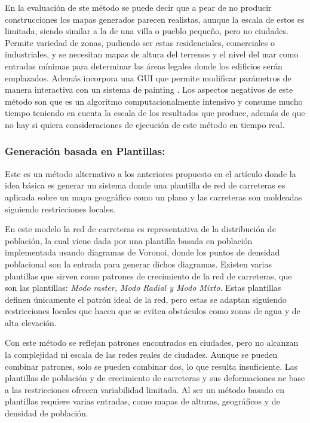             En la evaluación de ste método se puede decir que a pear de no producir construcciones los mapas generados parecen realistas, aunque la escala de estos es limitada, siendo similar a la de una villa o pueblo pequeño, pero no ciudades. Permite variedad de zonas, pudiendo ser estas residenciales, comerciales o industriales, y se necesitan mapas de altura del terrenos y el nivel del mar como entradas mínimas para determinar las áreas legales donde los edificios serán emplazados. Además incorpora una GUI que permite modificar parámetros de manera interactiva con un sistema de painting . Los aspectos negativos de este método son que es un algoritmo computacionalmente intensivo y consume mucho tiempo teniendo en cuenta la escala de los resultados que produce, además de que no hay si quiera consideraciones de ejecución de este método en tiempo real.
        
        \subsubsection{Generación basada en Plantillas:} Este es un método alternativo a los anteriores propuesto en el artículo \cite{Sun2002} donde la idea básica es generar un sistema donde una plantilla de red de carreteras es aplicada sobre un mapa geográfico como un plano y las carreteras son moldeadas siguiendo restricciones locales. 
        
            En este modelo la red de carreteras es representativa de la distribución de población, la cual viene dada por una plantilla basada en población implementada usando diagramas de Voronoi, donde los puntos de densidad poblacional son la entrada para generar dichos diagramas. Existen varias plantillas que sirven como patrones de crecimiento de la red de carreteras, que son las plantillas: \textit{Modo raster, Modo Radial y Modo Mixto}. Estas plantillas definen únicamente el patrón ideal de la red, pero estas se adaptan siguiendo restricciones locales que hacen que se eviten obstáculos como zonas de agua y de alta elevación. 

            Con este método se reflejan patrones encontrados en ciudades, pero no alcanzan la complejidad ni escala de las redes reales de ciudades. Aunque se pueden combinar patrones, solo se pueden combinar dos, lo que resulta insuficiente. Las plantillas de población y de crecimiento de carreteras y sus deformaciones ne base a las restricciones ofrecen variabilidad limitada. Al ser un método basado en plantillas requiere varias entradas, como mapas de alturas, geográficos y de densidad de población.

